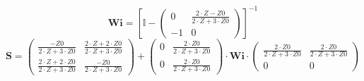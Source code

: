 \[ \mathbf{Wi} =  \left[ \mathbb{I}  - \left(\begin{array}{cc} 0 & \frac{2\cdot Z-Z0}{2\cdot Z+3\cdot Z0} \\ -1 & 0 \end{array}\right) \right]^{-1}  \]
\[ \mathbf{S} = \left(\begin{array}{cc} \frac{-Z0}{2\cdot Z+3\cdot Z0} & \frac{2\cdot Z+2\cdot Z0}{2\cdot Z+3\cdot Z0} \\ \frac{2\cdot Z+2\cdot Z0}{2\cdot Z+3\cdot Z0} & \frac{-Z0}{2\cdot Z+3\cdot Z0} \end{array}\right) + \left(\begin{array}{cc} 0 & \frac{2\cdot Z0}{2\cdot Z+3\cdot Z0} \\ 0 & \frac{2\cdot Z0}{2\cdot Z+3\cdot Z0} \end{array}\right) \cdot \mathbf{Wi} \cdot\left(\begin{array}{cc} \frac{2\cdot Z0}{2\cdot Z+3\cdot Z0} & \frac{2\cdot Z0}{2\cdot Z+3\cdot Z0} \\ 0 & 0 \end{array}\right) \]
